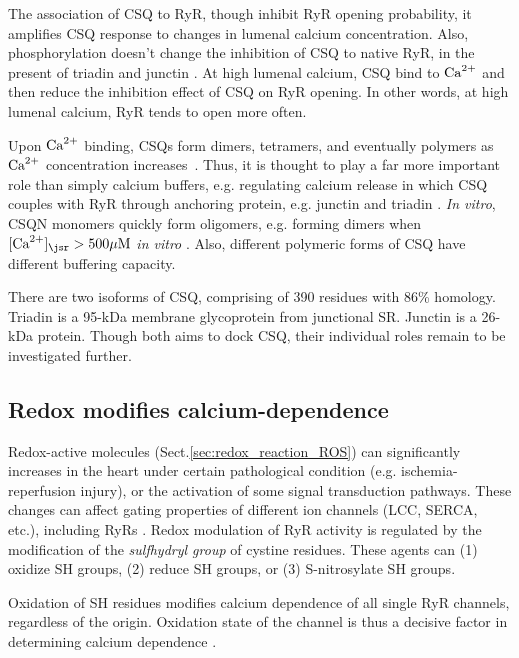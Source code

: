 The association of CSQ to RyR, though inhibit RyR opening probability, it
amplifies CSQ response to changes in lumenal calcium concentration. Also,
phosphorylation doesn't change the inhibition of CSQ to native RyR, in the
present of triadin and junctin \citep{Beard2005}.
At high lumenal calcium, CSQ bind to ${\text{Ca}^{2+}}$ and then reduce the inhibition effect
of CSQ on RyR opening. In other words, at high lumenal calcium, RyR tends to
open more often.

Upon ${\text{Ca}^{2+}}$ binding, CSQs form dimers, tetramers, and eventually polymers as
${\text{Ca}^{2+}}$ concentration increases~\citep{wang1998}. Thus, it is thought to play a
far more important role than simply calcium buffers, e.g. regulating calcium
release in which CSQ couples with RyR through anchoring protein, e.g. junctin
and triadin \citep{Gyorke2004a, zhang1997}. {\it In vitro}, CSQN monomers
quickly form oligomers, e.g. forming dimers when $[\Ca]_\jsr > 500\muM$ {\it in
vitro} \citep{park2004}. Also, different polymeric forms of CSQ have different
buffering capacity. 


\begin{framed}
There are two isoforms of CSQ, comprising of 390 residues with 86\% homology.
Triadin is a 95-kDa membrane glycoprotein from junctional SR.
Junctin is a 26-kDa protein. Though both aims to dock CSQ, their individual
roles remain to be investigated further. 
\end{framed}

\subsection{Redox modifies calcium-dependence}
\label{sec:redox_SHgroup}

Redox-active molecules (Sect.\ref{sec:redox_reaction_ROS}) can significantly
increases in the heart under certain pathological condition (e.g.
ischemia-reperfusion injury), or the activation of some signal transduction
pathways. These changes can affect gating properties of different ion channels
(LCC, SERCA, etc.), including RyRs \citep{zima2006}.
Redox modulation of RyR activity is regulated by the modification of the {\it
sulfhydryl group} of cystine residues. These agents can (1) oxidize SH groups,
(2) reduce SH groups, or (3) S-nitrosylate SH groups. 




Oxidation of SH residues modifies calcium dependence of all single RyR channels,
regardless of the origin. Oxidation state of the channel is thus a decisive
factor in determining calcium dependence \citep{marengo1998}. 



